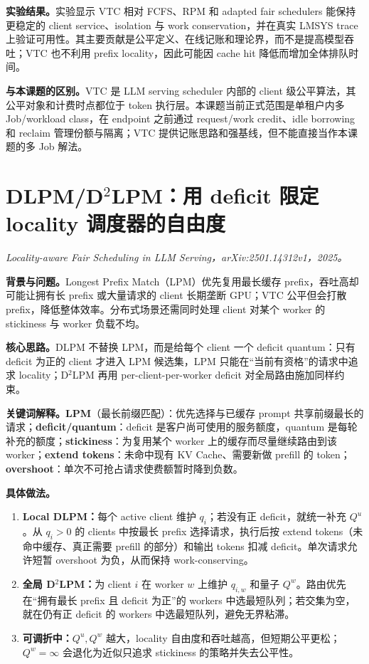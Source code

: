 \documentclass[10pt,a4paper]{ctexart}
\let\digestoriginalsection\section
\renewcommand{\section}{\Needspace{7\baselineskip}\digestoriginalsection}
\newcommand{\paperinfo}[1]{\textit{#1}\par}
\newcommand{\field}[1]{\par\noindent\textbf{#1。}\hspace{0.25em}}
\begin{document}
\field{实验结果}实验显示 VTC 相对 FCFS、RPM 和 adapted fair schedulers 能保持更稳定的 client service、isolation 与 work conservation，并在真实 LMSYS trace 上验证可用性。其主要贡献是公平定义、在线记账和理论界，而不是提高模型吞吐；VTC 也不利用 prefix locality，因此可能因 cache hit 降低而增加全体排队时间。

\field{与本课题的区别}VTC 是 LLM serving scheduler 内部的 client 级公平算法，其公平对象和计费时点都位于 token 执行层。本课题当前正式范围是单租户内多 Job/workload class，在 endpoint 之前通过 request/work credit、idle borrowing 和 reclaim 管理份额与隔离；VTC 提供记账思路和强基线，但不能直接当作本课题的多 Job 解法。

\section{DLPM/D\texorpdfstring{$^2$}{2}LPM：用 deficit 限定 locality 调度器的自由度}
\paperinfo{Locality-aware Fair Scheduling in LLM Serving，arXiv:2501.14312v1，2025。}

\field{背景与问题}Longest Prefix Match（LPM）优先复用最长缓存 prefix，吞吐高却可能让拥有长 prefix 或大量请求的 client 长期垄断 GPU；VTC 公平但会打散 prefix，降低整体效率。分布式场景还需同时处理 client 对某个 worker 的 stickiness 与 worker 负载不均。

\field{核心思路}DLPM 不替换 LPM，而是给每个 client 一个 deficit quantum：只有 deficit 为正的 client 才进入 LPM 候选集，LPM 只能在“当前有资格”的请求中追求 locality；D$^2$LPM 再用 per-client-per-worker deficit 对全局路由施加同样约束。

\field{关键词解释}\textbf{LPM}（最长前缀匹配）：优先选择与已缓存 prompt 共享前缀最长的请求；\textbf{deficit/quantum}：deficit 是客户尚可使用的服务额度，quantum 是每轮补充的额度；\textbf{stickiness}：为复用某个 worker 上的缓存而尽量继续路由到该 worker；\textbf{extend tokens}：未命中现有 KV Cache、需要新做 prefill 的 token；\textbf{overshoot}：单次不可抢占请求使费额暂时降到负数。

\field{具体做法}
\begin{enumerate}
  \item \textbf{Local DLPM：}每个 active client 维护 $q_i$；若没有正 deficit，就统一补充 $Q^u$。从 $q_i>0$ 的 clients 中按最长 prefix 选择请求，执行后按 extend tokens（未命中缓存、真正需要 prefill 的部分）和输出 tokens 扣减 deficit。单次请求允许短暂 overshoot 为负，从而保持 work-conserving。
  \item \textbf{全局 D$^2$LPM：}为 client $i$ 在 worker $w$ 上维护 $q_{i,w}$ 和量子 $Q^w$。路由优先在“拥有最长 prefix 且 deficit 为正”的 workers 中选最短队列；若交集为空，就在仍有正 deficit 的 workers 中选最短队列，避免无界粘滞。
  \item \textbf{可调折中：}$Q^u,Q^w$ 越大，locality 自由度和吞吐越高，但短期公平更松；$Q^w=\infty$ 会退化为近似只追求 stickiness 的策略并失去公平性。
\end{enumerate}
\end{document}
